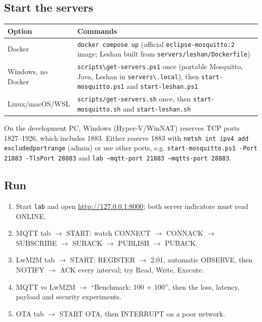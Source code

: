 \documentclass[11pt,a4paper]{article}
\newcommand{\code}[1]{\texttt{#1}}
\begin{document}
\subsection{Start the servers}
\begin{center}
\begin{tabularx}{\textwidth}{@{}lX@{}}
\toprule
Option & Commands \\
\midrule
Docker & \code{docker compose up} (official \code{eclipse-mosquitto:2} image; Leshan built from \code{servers/leshan/Dockerfile}) \\
Windows, no Docker & \code{scripts\textbackslash get-servers.ps1} once (portable Mosquitto, Java, Leshan in \code{servers\textbackslash.local}), then \code{start-mosquitto.ps1} and \code{start-leshan.ps1} \\
Linux/macOS/WSL & \code{scripts/get-servers.sh} once, then \code{start-mosquitto.sh} and \code{start-leshan.sh} \\
\bottomrule
\end{tabularx}
\end{center}
On the development PC, Windows (Hyper-V/WinNAT) reserves TCP ports 1827--1926,
which includes 1883. Either reserve 1883 with
\code{netsh int ipv4 add excludedportrange} (admin) or use other ports, e.g.
\code{start-mosquitto.ps1 -Port 21883 -TlsPort 28883} and
\code{lab --mqtt-port 21883 --mqtts-port 28883}.

\subsection{Run}
\begin{enumerate}
  \item Start \code{lab} and open \url{http://127.0.0.1:8000}; both server
        indicators must read ONLINE.
  \item MQTT tab $\rightarrow$ START: watch CONNECT $\rightarrow$ CONNACK
        $\rightarrow$ SUBSCRIBE $\rightarrow$ SUBACK $\rightarrow$ PUBLISH
        $\rightarrow$ PUBACK.
  \item LwM2M tab $\rightarrow$ START: REGISTER $\rightarrow$ 2.01, automatic
        OBSERVE, then NOTIFY $\rightarrow$ ACK every interval; try Read, Write,
        Execute.
  \item MQTT vs LwM2M $\rightarrow$ ``Benchmark: 100 + 100'', then the loss,
        latency, payload and security experiments.
  \item OTA tab $\rightarrow$ START OTA, then INTERRUPT on a poor network.
\end{enumerate}
\end{document}
